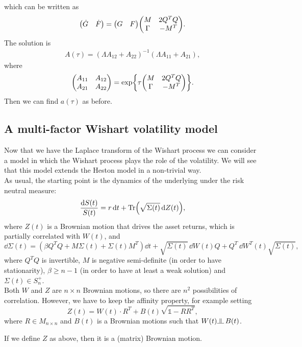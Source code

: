 which can be written as
\begin{equation*}
    \mqty(\dot{G} & \dot{F}) = \mqty(G & F)\mqty(M & 2Q^TQ \\ \Gamma & -M^T).
\end{equation*}
The solution is
\begin{align}
    A(\tau) = (\Lambda A_{12} + A_{22})^{-1}(\Lambda A_{11} + A_{21}),
\end{align}
where
\begin{equation}
    \mqty(A_{11} & A_{12} \\ A_{21} & A_{22}) = \exp{\tau\mqty(M & 2Q^TQ \\ \Gamma & -M^T)}.
\end{equation} %
Then we can find $a(\tau)$ as before.

\subsection{A multi-factor Wishart volatility model}
Now that we have the Laplace transform of the Wishart process we can consider a model in which the Wishart process plays the role of the volatility. We will see that this model extends the Heston model in a non-trivial way.\\
As usual, the starting point is the dynamics of the underlying under the risk neutral measure:
\begin{equation}
    \frac{\dd S(t)}{S(t)} = r\,\dd t + \Tr(\sqrt{\Sigma(t)} \,\dd Z(t)),
\end{equation}
where $Z(t)$ is a Brownian motion that drives the asset returns, which is partially correlated with $W(t)$, and
\begin{equation}
    \dd\Sigma(t) = (\beta Q^TQ + M\Sigma(t) + \Sigma(t)M^T)\dd t + \sqrt{\Sigma(t)}\,\dd W(t)Q + Q^T\,\dd W^T(t)\sqrt{\Sigma(t)},
\end{equation}
where $Q^TQ$ is invertible, $M$ is negative semi-definite (in order to have stationarity), $\beta\ge n-1$ (in order to have at least a weak solution) and $\Sigma(t)\in S^+_n$.\\
Both $W$ and $Z$ are $n\times n$ Brownian motions, so there are $n^2$ possibilities of correlation. However, we have to keep the affinity property, for example setting
\begin{equation}
    Z(t) = W(t)\cdot R^T + B(t)\sqrt{\mathds{1}-RR^T},
\end{equation}
where $R\in M_{n\times n}$ and $B(t)$ is a Brownian motions such that $W(t)\indep\, B(t)$.
\begin{proposition}
    If we define $Z$ as above, then it is a (matrix) Brownian motion.
\end{proposition}
